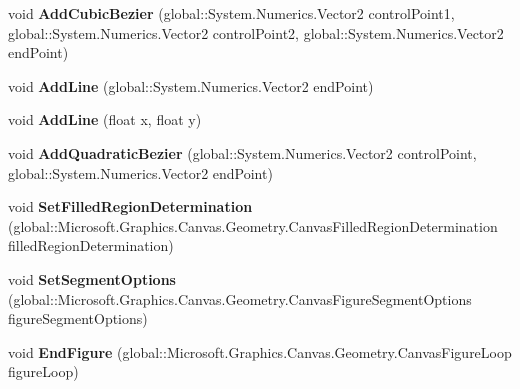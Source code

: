 \begin{DoxyCompactItemize}
void {\bfseries Add\+Cubic\+Bezier} (global\+::\+System.\+Numerics.\+Vector2 control\+Point1, global\+::\+System.\+Numerics.\+Vector2 control\+Point2, global\+::\+System.\+Numerics.\+Vector2 end\+Point)
\item 
\mbox{\label{class_microsoft_1_1_graphics_1_1_canvas_1_1_geometry_1_1_canvas_path_builder_a977ac73b78685510b323dc0f9f9d92a2}} 
void {\bfseries Add\+Line} (global\+::\+System.\+Numerics.\+Vector2 end\+Point)
\item 
\mbox{\label{class_microsoft_1_1_graphics_1_1_canvas_1_1_geometry_1_1_canvas_path_builder_ab36909f8900a9d581be0045841b600a6}} 
void {\bfseries Add\+Line} (float x, float y)
\item 
\mbox{\label{class_microsoft_1_1_graphics_1_1_canvas_1_1_geometry_1_1_canvas_path_builder_a2cf174a6a37788207d5f4464513863e4}} 
void {\bfseries Add\+Quadratic\+Bezier} (global\+::\+System.\+Numerics.\+Vector2 control\+Point, global\+::\+System.\+Numerics.\+Vector2 end\+Point)
\item 
\mbox{\label{class_microsoft_1_1_graphics_1_1_canvas_1_1_geometry_1_1_canvas_path_builder_a933ad60d19366b2851e3ad2a78ce363c}} 
void {\bfseries Set\+Filled\+Region\+Determination} (global\+::\+Microsoft.\+Graphics.\+Canvas.\+Geometry.\+Canvas\+Filled\+Region\+Determination filled\+Region\+Determination)
\item 
\mbox{\label{class_microsoft_1_1_graphics_1_1_canvas_1_1_geometry_1_1_canvas_path_builder_a39666b72c541b2b7bf5ce95ef802b83f}} 
void {\bfseries Set\+Segment\+Options} (global\+::\+Microsoft.\+Graphics.\+Canvas.\+Geometry.\+Canvas\+Figure\+Segment\+Options figure\+Segment\+Options)
\item 
\mbox{\label{class_microsoft_1_1_graphics_1_1_canvas_1_1_geometry_1_1_canvas_path_builder_ae0a5d2f680c829d0627fd7361a291e5b}} 
void {\bfseries End\+Figure} (global\+::\+Microsoft.\+Graphics.\+Canvas.\+Geometry.\+Canvas\+Figure\+Loop figure\+Loop)

\end{DoxyCompactItemize}

